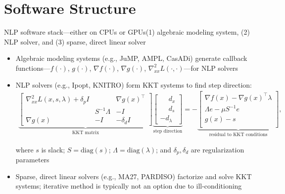 \documentclass[aspectratio=169,11pt]{beamer}
\begin{document}
\section{Software Structure}
\newcommand{\kktsystem}{%
  \begin{align*}
    \underbrace{
    \begin{bmatrix}
      \nabla^2_{x x} L(x,s,\lambda) + \delta_p I & & \nabla g(x)^\top
      \\ & S^{-1}\Lambda &  -I
      \\ \nabla g(x) & -I &  - \delta_d I
    \end{bmatrix}
    }_{\text{KKT matrix}}
    \underbrace{
    \begin{bmatrix}
      \phantom{-}d_x \\
      \phantom{-}d_s \\
      -d_\lambda
    \end{bmatrix}}_{\text{step direction}} =
    -\underbrace{\begin{bmatrix}
      \nabla f(x) - \nabla g(x)^\top \lambda\\
      \Lambda e - \mu S^{-1}e \\
      g(x) - s\\
    \end{bmatrix}}_{\text{residual to KKT conditions}},
  \end{align*}
}
\begin{frame}{NLP software stack---either on CPUs or GPUs}{{(1) algebraic modeling system}, {(2) NLP solver}, and {(3) sparse, direct linear solver}}
  \begin{itemize}
  \item<2-> \alert{Algebraic modeling systems} (e.g., JuMP, AMPL, CasADi) generate \alert{callback functions---$f(\cdot)$, $g(\cdot)$, $\nabla f(\cdot)$, $\nabla g(\cdot)$, $\nabla^2_{xx} L(\cdot,\cdot)$}---for \alert{NLP solvers}
  \item<3-> \alert{NLP solvers} (e.g., Ipopt, KNITRO) form \alert{KKT systems} to find step direction:
  \kktsystem
    where $s$ is slack; $S=\text{diag}(s)$; $\Lambda=\text{diag}(\lambda)$; and $\delta_p,\delta_d$ are regularization parameters
  \item<4-> \alert{Sparse, direct linear solvers} (e.g., MA27, PARDISO) factorize and solve KKT systems; iterative method is typically not an option due to \alert{ill-conditioning}
  \end{itemize}
\end{frame}
\end{document}
